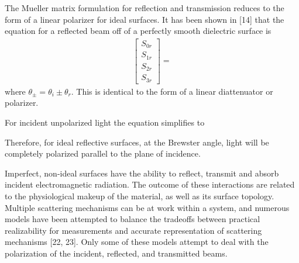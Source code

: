 
The Mueller matrix formulation for reflection and transmission reduces to the form of a linear polarizer for ideal surfaces.  It has been shown in [14] that the equation for a reflected beam off of a perfectly smooth dielectric surface is
%
\begin{align}
    \begin{bmatrix}
        S_{0r} \\
        S_{1r} \\
        S_{2r} \\
        S_{3r}
    \end{bmatrix}
    =
\end{align}
%
where $\theta_{\pm}=\theta_i \pm \theta_r$. This is identical to the form of a linear diattenuator or polarizer.

For incident unpolarized light the equation simplifies to
%

%
Therefore, for ideal reflective surfaces, at the Brewster angle, light will be completely polarized parallel to the plane of incidence.

Imperfect, non-ideal surfaces have the ability to reflect, transmit and absorb incident electromagnetic radiation.  The outcome of these interactions are related to the physiological makeup of the material, as well as its surface topology.  Multiple scattering mechanisms can be at work within a system, and numerous models have been attempted to balance the tradeoffs between practical realizability for measurements and accurate representation of scattering mechanisms [22, 23].  Only some of these models attempt to deal with the polarization of the incident, reflected, and transmitted beams.
